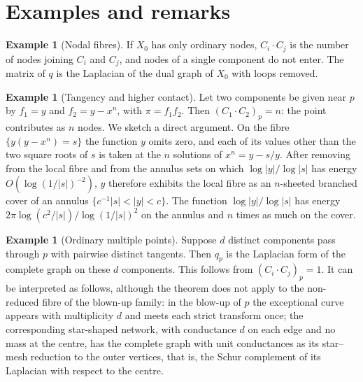 \documentclass[11pt]{amsart}
\theoremstyle{definition}
\newtheorem{example}[theorem]{Example}
\theoremstyle{remark}
\begin{document}
\section{Examples and remarks}\label{sec:examples}

\begin{example}[Nodal fibres]\label{ex:nodal}
If $X_0$ has only ordinary nodes, $C_i\cdot C_j$ is the number of nodes
joining $C_i$ and $C_j$, and nodes of a single component do not enter.
The matrix of $q$ is the Laplacian of the dual graph of $X_0$ with loops
removed.
\end{example}

\begin{example}[Tangency and higher contact]\label{ex:tacnode}
Let two components be given near $p$ by $f_1=y$ and $f_2=y-x^n$, with
$\pi=f_1f_2$. Then $(C_1\cdot C_2)_p=n$: the point contributes as $n$
nodes. We sketch a direct argument. On the fibre $\{y(y-x^n)=s\}$ the
function $y$ omits zero, and each of its values other than the two square
roots of $s$ is taken at the $n$ solutions of $x^n=y-s/y$. After removing from the
local fibre and from the annulus sets on which $\log|y|/\log|s|$ has
energy $O(\log(1/|s|)^{-2})$, $y$ therefore exhibits the local fibre as an
$n$-sheeted branched cover of an annulus $\{c^{-1}|s|<|y|<c\}$. The
function $\log|y|/\log|s|$ has energy $2\pi\log(c^2/|s|)/\log(1/|s|)^2$
on the annulus and $n$ times as much on the cover.
\end{example}

\begin{example}[Ordinary multiple points]\label{ex:multiple}
Suppose $d$ distinct components pass through $p$ with pairwise distinct
tangents. Then $q_p$ is the Laplacian form of the complete graph on these
$d$ components. This follows from $(C_i\cdot C_j)_p=1$. It can be
interpreted as follows, although the theorem does not apply to the
non-reduced fibre of the blown-up family: in the blow-up of $p$ the exceptional curve
appears with multiplicity $d$ and meets each strict transform once; the
corresponding star-shaped network, with conductance $d$ on each edge and
no mass at the centre, has the complete graph with unit conductances as
its star--mesh reduction to the outer vertices, that is, the Schur
complement of its Laplacian with respect to the centre.
\end{example}
\end{document}
